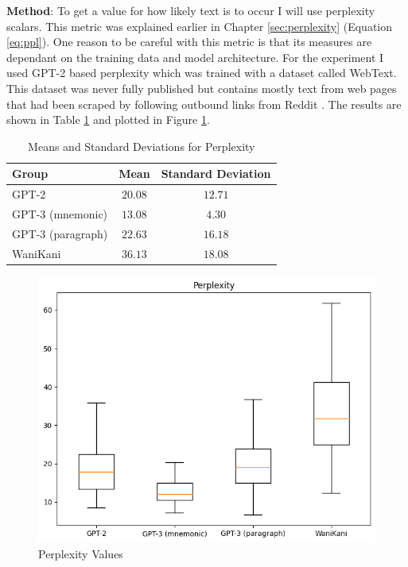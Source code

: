 \textbf{Method}: To get a value for how likely text is to occur I will use perplexity scalars. This metric was explained earlier in Chapter \ref{sec:perplexity} (Equation \ref{eq:ppl}). One reason to be careful with this metric is that its measures are dependant on the training data and model architecture. For the experiment I used GPT-2 based perplexity which was trained with a dataset called WebText. This dataset was never fully published but contains mostly text from web pages that had been scraped by following outbound links from Reddit \cite{gpt2_hugging_face}. The results are shown in Table \ref{tab:ppl_whole_mnemonic} and plotted in Figure \ref{figure:ppl_whole_mnemonic}.     
\begin{table}[ht] 
\centering
\caption{Means and Standard Deviations for Perplexity}
\label{table:group_stats}
\begin{tabular}{lcc}
\toprule
Group & Mean & Standard Deviation \\
\midrule
GPT-2& $20.08$ & $12.71$ \\
GPT-3 (mnemonic) & $13.08$ & $4.30$ \\
GPT-3 (paragraph)& $22.63$ & $16.18$ \\
WaniKani & $36.13$ & $18.08$ \\
\bottomrule
\end{tabular}
\label{tab:ppl_whole_mnemonic}
\end{table}
\begin{figure}
    \centering
    \includegraphics[width=400pt]{resources/ppl_entire_mnemonic.png}
    \caption{Perplexity Values}
    \label{figure:ppl_whole_mnemonic}
\end{figure}

